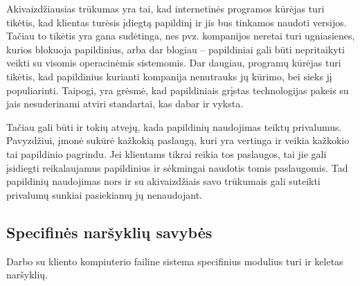 \documentclass[12pt,a4paper,titlepage]{article}
\begin{document}
Akivaizdžiausias trūkumas yra tai, kad internetinės programos kūrėjas turi tikėtis, kad klientas turėsis įdiegtą papildinį ir jis bus tinkamos naudoti versijos. Tačiau to tikėtis yra gana sudėtinga, nes pvz. kompanijos neretai turi ugniasienes, kurios blokuoja papildinius, arba dar blogiau – papildiniai gali būti nepritaikyti veikti su visomis operacinėmis sistemomis. Dar daugiau, programų kūrėjas turi tikėtis, kad papildinius kurianti kompanija nenutrauks jų kūrimo, bei sieks jį populiarinti. Taipogi, yra grėsmė, kad papildiniais grįstas technologijas pakeis su jais nesuderinami atviri standartai, kas dabar ir vyksta.

Tačiau gali būti ir tokių atvejų, kada papildinių naudojimas teiktų privalumus. Pavyzdžiui, įmonė sukūrė kažkokią paslaugą, kuri yra vertinga ir veikia kažkokio tai papildinio pagrindu. Jei klientams tikrai reikia tos paslaugos, tai jie gali įsidiegti reikalaujamus papildinius ir sėkmingai naudotis tomis paslaugomis. Tad papildinių naudojimas nors ir su akivaizdžiais savo trūkumais gali suteikti privalumų sunkiai pasiekiamų jų nenaudojant.

\subsection{Specifinės naršyklių savybės}

Darbo su kliento kompiuterio failine sistema specifinius modulius turi ir keletas naršyklių. 
\end{document}
